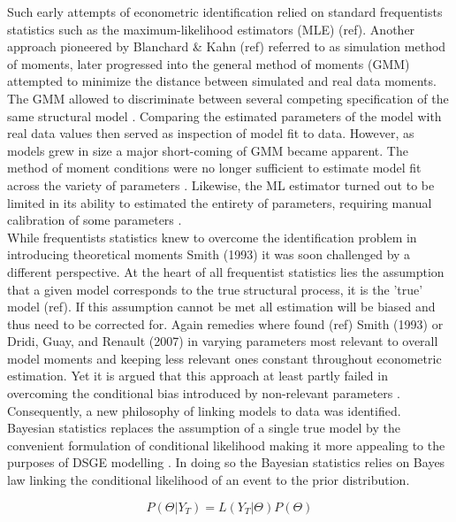 \documentclass[11pt,a4paper,english]{article} %
\begin{document}
	Such early attempts of econometric identification relied on standard frequentists statistics such as the maximum-likelihood estimators (MLE) (ref). Another approach pioneered by Blanchard \& Kahn (ref) referred to as simulation method of moments, later progressed into the general method of moments (GMM) attempted to minimize the distance between simulated and real data moments. The GMM allowed to discriminate between several competing specification of the same structural model \cite{christiano_current_1992}. Comparing the estimated parameters of the model with real data values then served as inspection of model fit to data. However, as models grew in size a major short-coming of GMM became apparent. The method of moment conditions were no longer sufficient to estimate model fit across the variety of parameters \cite{guerron-quintana_bayesian_2013}. Likewise, the ML estimator turned out to be limited in its ability to estimated the entirety of parameters, requiring manual calibration of some parameters \cite{guerron-quintana_bayesian_2013}.\\
	
	While frequentists statistics knew to overcome the identification problem in introducing theoretical moments Smith (1993) it was soon challenged by a different perspective. At the heart of all frequentist statistics lies the assumption that a given model corresponds to the true structural process, it is the 'true' model (ref). If this assumption cannot be met all estimation will be biased and thus need to be corrected for. Again remedies where found (ref) Smith (1993) or Dridi, Guay, and Renault (2007) in varying parameters most relevant to overall model moments and keeping less relevant ones constant throughout econometric estimation. Yet it is argued that this approach at least partly failed in overcoming the conditional bias introduced by non-relevant parameters \cite{guerron-quintana_bayesian_2013}.\\
	
	Consequently, a new philosophy of linking models to data was identified. Bayesian statistics replaces the assumption of a single true model by the convenient formulation of conditional likelihood making it more appealing to the purposes of DSGE modelling \cite{guerron-quintana_bayesian_2013}. In doing so the Bayesian statistics relies on Bayes law linking the conditional likelihood of an event to the prior distribution.
		
	\[
	P( \Theta | Y_{T}) = L(Y_{T} | \Theta) P(\Theta)
	\]
		
\end{document}
